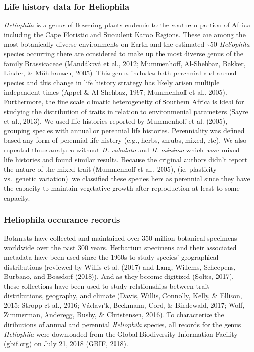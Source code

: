 \documentclass[man,floatsintext]{apa6}
\theoremstyle{definition}
\theoremstyle{definition}
\theoremstyle{definition}
\theoremstyle{remark}
\begin{document}
\hypertarget{life-history-data-for-heliophila}{%
\subsubsection{Life history data for
Heliophila}\label{life-history-data-for-heliophila}}

\emph{Heliophila} is a genus of flowering plants endemic to the southern
portion of Africa including the Cape Floristic and Succulent Karoo
Regions. These are among the most botanically diverse environments on
Earth and the estimated \textasciitilde{}50 \emph{Heliophila} species
occurring there are considered to make up the most diverse genus of the
family Brassicaceae (Mandáková et al., 2012; Mummenhoff, Al-Shehbaz,
Bakker, Linder, \& Mühlhausen, 2005). This genus includes both perennial
and annual species and this change in life history strategy has likely
arisen multiple independent times (Appel \& Al-Shehbaz, 1997; Mummenhoff
et al., 2005). Furthermore, the fine scale climatic heterogeneity of
Southern Africa is ideal for studying the distribution of traits in
relation to environmental parameters (Sayre et al., 2013). We used life
histories reported by Mummenhoff et al. (2005), grouping species with
annual or perennial life histories. Perenniality was defined based any
form of perennial life history (e.g., herbs, shrubs, mixed, etc). We
also repeated these analyses without \emph{H. subulata} and \emph{H.
minima} which have mixed life histories and found similar results.
Because the original authors didn't report the nature of the mixed trait
(Mummenhoff et al., 2005), (ie. plasticity vs.~genetic variation), we
classified these species here as perennial since they have the capacity
to maintain vegetative growth after reproduction at least to some
capacity.

\hypertarget{heliophila-occurance-records}{%
\subsubsection{Heliophila occurance
records}\label{heliophila-occurance-records}}

Botanists have collected and maintained over 350 million botanical
specimens worldwide over the past 300 years. Herbarium specimens and
their associated metadata have been used since the 1960s to study
species' geographical distributions (reviewed by Willis et al. (2017)
and Lang, Willems, Scheepens, Burbano, and Bossdorf (2018)). And as they
become digitized (Soltis, 2017), these collections have been used to
study relationships between trait distributions, geography, and climate
(Davis, Willis, Connolly, Kelly, \& Ellison, 2015; Stropp et al., 2016;
Václavı'k, Beckmann, Cord, \& Bindewald, 2017; Wolf, Zimmerman,
Anderegg, Busby, \& Christensen, 2016). To characterize the diributions
of annual and perennial \emph{Heliophila} species, all records for the
genus \emph{Heliophila} were downloaded from the Global Biodiversity
Information Facility (gbif.org) on July 21, 2018 (GBIF, 2018).
\end{document}
